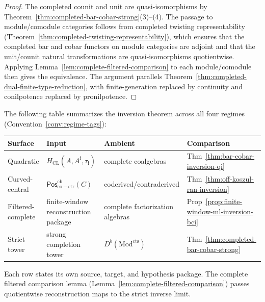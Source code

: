 \begin{proof}
The completed counit and unit are quasi-isomorphisms by
Theorem~\ref{thm:completed-bar-cobar-strong}(3)--(4). The
passage to module/comodule categories follows from completed twisting
representability
(Theorem~\ref{thm:completed-twisting-representability}), which
ensures that the completed bar and cobar functors on
module categories are adjoint and that the unit/counit natural
transformations are quasi-isomorphisms quotientwise. Applying
Lemma~\ref{lem:complete-filtered-comparison} to each module/comodule
then gives the equivalence. The argument parallels
Theorem~\ref{thm:completed-dual-finite-type-reduction}, with
finite-generation replaced by continuity and conilpotence replaced
by pronilpotence.
\end{proof}

\begin{remark}
\label{rem:four-regime-inversion}
The following table summarizes the inversion theorem across all four
regimes (Convention~\ref{conv:regime-tags}):
\begin{center}
\renewcommand{\arraystretch}{1.3}
\begin{tabular}{@{}llll@{}}
\toprule
\textbf{Surface} & \textbf{Input} & \textbf{Ambient}
 & \textbf{Comparison} \\
\midrule
Quadratic &
 \(H_{\mathrm{CL}}(A,A^{\mathrm i},\tau_{\mathrm i})\) &
 complete coalgebras &
 Thm~\ref{thm:bar-cobar-inversion-qi} \\
Curved-central &
 \(\mathsf{Pos}^{\mathrm{ch}}_{\mathrm{co-ctr}}(C)\) &
 coderived/contraderived &
 Thm~\ref{thm:off-koszul-ran-inversion} \\
Filtered-complete &
 finite-window reconstruction package &
 complete factorization algebras &
 Prop~\ref{prop:finite-window-ml-inversion-bci} \\
Strict tower &
 strong completion tower &
 $D^b(\mathrm{Mod}^{\mathrm{cts}})$ &
 Thm~\ref{thm:completed-bar-cobar-strong} \\
\bottomrule
\end{tabular}
\end{center}
Each row states its own source, target, and hypothesis package.  The
complete filtered comparison lemma
(Lemma~\ref{lem:complete-filtered-comparison}) passes
quotientwise reconstruction maps to the strict inverse limit.
\end{remark}


